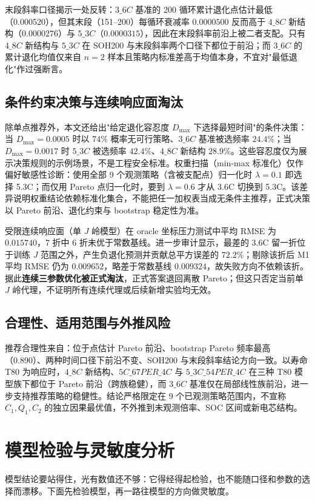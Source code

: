 \documentclass[withoutpreface,bwprint]{cumcmthesis}
\begin{document}
末段斜率口径揭示一处反转：$3\_6C$ 基准的 200 循环累计退化点估计最低（0.000520），但其末段（151--200）每循环衰减率 $0.0000500$ 反而高于 $4\_8C$ 新结构（$0.0000276$）与 $5\_3C$（$0.0000315$），因此在末段斜率前沿上被二者支配。只有 $4\_8C$ 新结构与 $5\_3C$ 在 SOH200 与末段斜率两个口径下都位于前沿；而 $3\_6C$ 的累计退化均值仅来自 $n=2$ 样本且策略内标准差高于均值本身，不宜对"最低退化"作过强断言。

\subsection{条件约束决策与连续响应面淘汰}
除单点推荐外，本文还给出"给定退化容忍度 $D_{\max}$ 下选择最短时间"的条件决策：当 $D_{\max}=0.0005$ 时以 $74\%$ 概率无可行策略、$3\_6C$ 基准被选频率 $24.4\%$；当 $D_{\max}=0.0017$ 时 $5\_3C$ 被选频率 $42.4\%$、$4\_8C$ 新结构 $28.9\%$。这些容忍度仅为展示决策规则的示例场景，不是工程安全标准。权重扫描（min-max 标准化）仅作偏好敏感性诊断：使用全部 9 个观测策略（含被支配点）归一化时 $\lambda=0.1$ 即选择 5.3C；而仅用 Pareto 点归一化时，要到 $\lambda=0.6$ 才从 3.6C 切换到 5.3C。该差异说明权重结论依赖标准化集合，不能把任一加权表当成无条件主推荐，正式决策以 Pareto 前沿、退化约束与 bootstrap 稳定性为准。

受限连续响应面（单 $J$ 岭模型）在 oracle 坐标压力测试中平均 RMSE 为 $0.015740$，7 折中 6 折未优于常数基线。进一步审计显示，最差的 3.6C 留一折位于训练 $J$ 范围之外，产生负退化预测并贡献总平方误差的 $72.2\%$；剔除该折后 M1 平均 RMSE 仍为 $0.009652$，略差于常数基线 $0.009324$，故失败方向不依赖该折。据此\textbf{连续三参数优化被正式淘汰}，正式答案退回离散 Pareto；但这只否定当前单 $J$ 岭代理，不证明所有连续代理或后续新增实验均无效。

\subsection{合理性、适用范围与外推风险}
推荐合理性来自：位于点估计 Pareto 前沿、bootstrap Pareto 频率最高（0.890）、两种时间口径下前沿不变、SOH200 与末段斜率结论方向一致。以寿命 T80 为响应时，$4\_8C$ 新结构、$5C\_67PER\_4C$ 与 $5\_3C\_54PER\_4C$ 在三种 T80 模型族下都位于 Pareto 前沿（跨族稳健），而 $3\_6C$ 基准仅在局部线性族前沿，进一步支持推荐策略的稳健性。结论严格限定在 9 个已观测策略范围内，不宣称 $C_1,Q_1,C_2$ 的独立因果最优值，不外推到未观测倍率、SOC 区间或新电芯结构。

\section{模型检验与灵敏度分析}
模型结论要站得住，光有数值还不够：它得经得起检验，也不能随口径和参数的选择而漂移。下面先检验模型，再一路往模型的方向做灵敏度。
\end{document}
